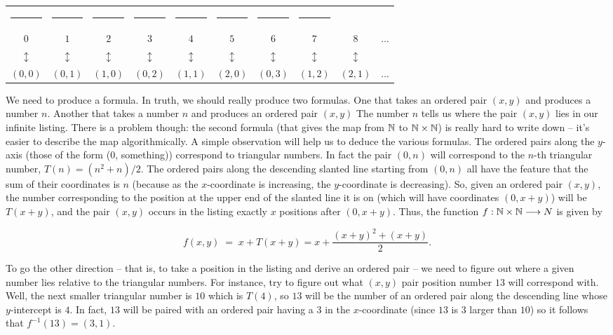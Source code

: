 \begin{tabular}{cccccccccc}
\rule{32pt}{0pt} & \rule{32pt}{0pt} & \rule{32pt}{0pt} & \rule{32pt}{0pt} & \rule{32pt}{0pt} & \rule{32pt}{0pt} & \rule{32pt}{0pt} & \rule{32pt}{0pt} \\
$0$ & $1$ & $2$ & $3$ & $4$ & $5$ & $6$ & $7$ & $8$ & $\ldots$ \\
$\updownarrow$ & $\updownarrow$ & $\updownarrow$ & $\updownarrow$ & $\updownarrow$ & $\updownarrow$ &  $\updownarrow$ & $\updownarrow$ & $\updownarrow$ & \\
$(0, 0)$ & $(0, 1)$ & $(1, 0)$ & $(0, 2)$ & $(1, 1)$ & $(2, 0)$ & $(0, 3)$ & $(1,2)$ & $(2, 1)$ & $\ldots$ \\
\end{tabular}
\medskip

We need to produce a formula.  In truth, we should really produce two
formulas.  One that takes an ordered pair $(x, y)$ and produces a number $n$.
Another that takes a number $n$ and produces an ordered pair $(x, y)$ The
number $n$ tells us where the pair $(x, y)$ lies in our infinite listing.  
There is a
problem though: the second formula (that gives the map from ${\mathbb N}$  
to ${\mathbb N} \times {\mathbb N}$)
is really hard to write down -- it's easier to describe the map 
algorithmically. 
 A simple observation will help us to deduce the various formulas.  The
ordered pairs along the $y$-axis (those of the form (0, something)) correspond
to triangular numbers.  In fact the pair $(0, n)$ will correspond to the $n$-th triangular
number, $T(n) = (n^2 + n)/2$.  The ordered pairs along the descending
slanted line starting from $(0, n)$  all have the feature that the sum of their
coordinates is $n$ (because as the $x$-coordinate is increasing, the 
$y$-coordinate
is decreasing).  So, given an ordered pair $(x, y)$, the number corresponding
to the position at the upper end of the slanted line it is on (which will have
coordinates $(0, x+y)$) will be $T(x+y)$, and the pair $(x, y)$ occurs in the listing exactly $x$ positions after $(0, x + y)$.  Thus, the function 
$f : {\mathbb N} \times {\mathbb N} \longrightarrow N$ is
given by

\[ f(x, y) \; = \; x + T(x + y) = x + \frac{(x + y)^2 + (x + y)}{2}. \]

\noindent To go the other direction -- that is, to take a position 
in the listing and
derive an ordered pair -- we need to figure out where a given number lies
relative to the triangular numbers.  For instance, try to figure out what
$(x, y)$ pair position number $13$ will correspond with.  Well, the next smaller
triangular number is $10$ which is $T(4)$, so $13$ will be the number of an 
ordered pair along the descending line whose $y$-intercept is $4$.  
In fact, $13$ will be paired
with an ordered pair having a $3$ in the $x$-coordinate (since $13$ is $3$ 
larger than $10$) so it follows that $f^{-1}(13) = (3, 1)$.


